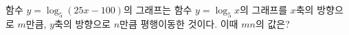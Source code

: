 함수 $y=\log_5 (25x-100)$의 그래프는 함수 $y=\log_5 x$의 그래프를 $x$축의 방향으로 $m$만큼, $y$축의 방향으로 $n$만큼 평행이동한 것이다. 이때 $mn$의 값은?
